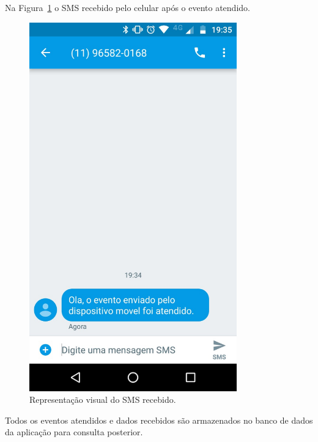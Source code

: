 Na Figura~\ref{fig:smsRecebido2} o SMS recebido pelo celular após o evento atendido.
\begin{figure}[h!]
	\begin{center}
		\includegraphics[width=0.8\textwidth]{./img/smsRecebido2}
		\caption{Representação visual do SMS recebido.}
		\label{fig:smsRecebido2}
	\end{center}
\end{figure}

Todos os eventos atendidos e dados recebidos são armazenados no banco de dados da aplicação para consulta posterior.